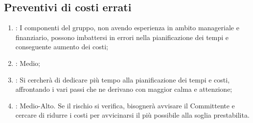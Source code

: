 \subsection{Preventivi di costi errati}
\begin{enumerate}
\item {}: I componenti del gruppo, non avendo esperienza in ambito manageriale e finanziario, possono imbattersi in errori nella pianificazione dei tempi e conseguente aumento dei costi;
\item {}: Medio;
\item {}: Si cercherà di dedicare più tempo alla pianificazione dei tempi e costi, affrontando i vari passi che ne derivano con maggior calma e attenzione;
\item {}: Medio-Alto. Se il rischio si verifica, bisognerà avvisare il Committente e cercare di ridurre i costi per avvicinarsi il più possibile alla soglia prestabilita.
\end{enumerate}
